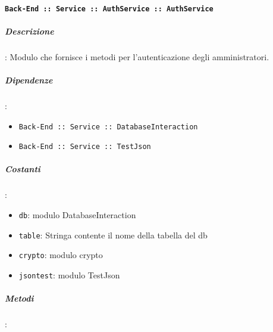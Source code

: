 \documentclass[../DefinizioneDiProdotto_v3.0.0.tex]{subfiles}
\begin{document}
\paragraph{\texttt{Back-End :: Service :: AuthService :: AuthService}}
\subparagraph{Descrizione}: Modulo che fornisce i metodi per l'autenticazione degli amministratori.
\subparagraph{Dipendenze}:
\begin{itemize}
	\item \texttt{Back-End :: Service :: DatabaseInteraction}
	\item \texttt{Back-End :: Service :: TestJson}
\end{itemize}
\subparagraph{Costanti}:
\begin{itemize}
	\item \texttt{db}: modulo DatabaseInteraction
	\item \texttt{table}: Stringa contente il nome della tabella del db
	\item \texttt{crypto}: modulo crypto
	\item \texttt{jsontest}: modulo TestJson
\end{itemize}
\subparagraph{Metodi}:
\end{document}
